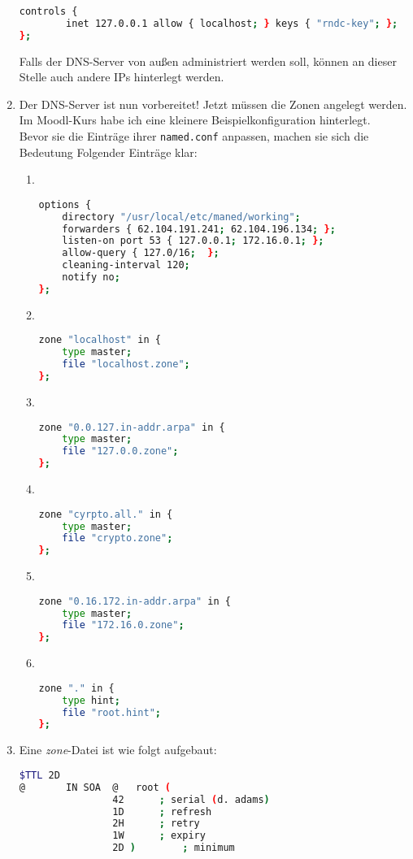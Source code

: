\documentclass[paper=a4,fontsize=11pt]{scrartcl}%
\numberwithin{equation}{section}
\begin{document}
\begin{enumerate}
\begin{lstlisting}[style=Bash, language=Bash]
controls {
        inet 127.0.0.1 allow { localhost; } keys { "rndc-key"; };
};
\end{lstlisting}
Falls der DNS-Server von außen administriert werden soll, können an dieser Stelle auch andere IPs hinterlegt werden.			
	\item Der DNS-Server ist nun vorbereitet! Jetzt müssen die Zonen angelegt werden. Im Moodl-Kurs habe ich eine kleinere Beispielkonfiguration hinterlegt.\\
	Bevor sie die Einträge ihrer \texttt{named.conf} anpassen, machen sie sich die Bedeutung Folgender Einträge klar:
	\begin{enumerate}
		\item ~\\
\begin{lstlisting}[style=Bash, language=Bash]
options { 
	directory "/usr/local/etc/maned/working"; 
	forwarders { 62.104.191.241; 62.104.196.134; };
	listen-on port 53 { 127.0.0.1; 172.16.0.1; };
	allow-query { 127.0/16;  };
	cleaning-interval 120;
	notify no;
};
\end{lstlisting}
		\item ~\\
\begin{lstlisting}[style=Bash, language=Bash]
zone "localhost" in {
	type master;
	file "localhost.zone";
};
\end{lstlisting}
		\item ~\\
\begin{lstlisting}[style=Bash, language=Bash]
zone "0.0.127.in-addr.arpa" in {
	type master;
	file "127.0.0.zone";
};
\end{lstlisting}
	\item ~\\
\begin{lstlisting}[style=Bash, language=Bash]
zone "cyrpto.all." in {
	type master;
	file "crypto.zone";
};
\end{lstlisting}
		\item ~\\
\begin{lstlisting}[style=Bash, language=Bash]
zone "0.16.172.in-addr.arpa" in {
	type master;
	file "172.16.0.zone";
};
	\end{lstlisting}
	\item ~\\
\begin{lstlisting}[style=Bash, language=Bash]
zone "." in {
	type hint;	
	file "root.hint";
};
\end{lstlisting}
	\end{enumerate}
	\item Eine \emph{zone}-Datei ist wie folgt aufgebaut:
\begin{lstlisting}[style=Bash, language=Bash]
$TTL 2D
@		IN SOA	@   root (
				42		; serial (d. adams)
				1D		; refresh
				2H		; retry
				1W		; expiry
				2D )		; minimum


\end{lstlisting}
\end{enumerate}
\end{document}
